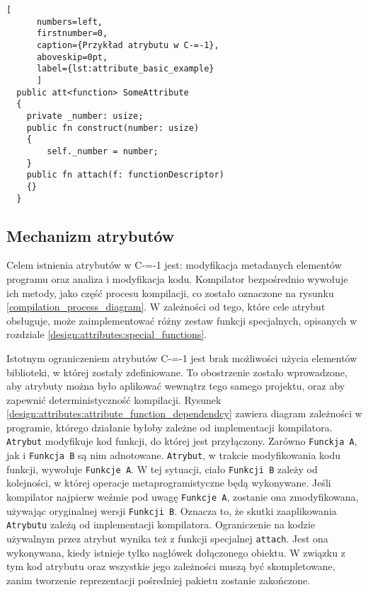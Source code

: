 \begin{minipage}{\linewidth}
  
	\begin{lstlisting}[
	  numbers=left,
	  firstnumber=0,
	  caption={Przykład atrybutu w C-=-1},
	  aboveskip=0pt,
	  label={lst:attribute_basic_example}
	  ]
  public att<function> SomeAttribute
  {
	private _number: usize;
	public fn construct(number: usize)
	{
		self._number = number;
	}
	public fn attach(f: functionDescriptor)
	{}
  }
  \end{lstlisting}
  \end{minipage}
\subsection{Mechanizm atrybutów}
\label{Attributes_mechanism_cm1}

Celem istnienia atrybutów w C-=-1 jest: modyfikacja metadanych elementów programu oraz analiza i modyfikacja kodu.
Kompilator bezpośrednio wywołuje ich metody, jako część procesu kompilacji, co zostało oznaczone na rysunku \ref{compilation_process_diagram}.
W zależności od tego, które cele atrybut obsługuje, może zaimplementować różny zestaw funkcji specjalnych, opisanych w rozdziale \ref{design:attributes:special_functions}.

Istotnym ograniczeniem atrybutów C-=-1 jest brak możliwości użycia elementów biblioteki, w której zostały zdefiniowane.
To obostrzenie zostało wprowadzone, aby atrybuty można było aplikować wewnątrz tego samego projektu, oraz aby zapewnić deterministyczność kompilacji.
Rysunek \ref{design:attributes:attribute_function_dependendcy} zawiera diagram zależności w programie, którego działanie byłoby zależne od implementacji kompilatora.
\lstinline{Atrybut} modyfikuje kod funkcji, do której jest przyłączony.
Zarówno \lstinline{Funckja A}, jak i \lstinline{Funkcja B} są nim adnotowane.
\lstinline{Atrybut}, w trakcie modyfikowania kodu funkcji, wywołuje \lstinline{Funkcje A}.
W tej sytuacji, ciało \lstinline{Funkcji B} zależy od kolejności, w której operacje metaprogramistyczne będą wykonywane.
Jeśli kompilator najpierw weźmie pod uwagę \lstinline{Funkcje A}, zostanie ona zmodyfikowana, używając oryginalnej wersji \lstinline{Funkcji B}.
Oznacza to, że skutki zaaplikowania \lstinline{Atrybutu} zależą od implementacji kompilatora.
Ograniczenie na kodzie używalnym przez atrybut wynika też z funkcji specjalnej \lstinline{attach}.
Jest ona wykonywana, kiedy istnieje tylko nagłówek dołączonego obiektu.
W związku z tym kod atrybutu oraz wszystkie jego zależności muszą być skompletowane, zanim tworzenie reprezentacji pośredniej pakietu zostanie zakończone.

